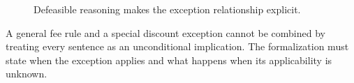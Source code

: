 \begin{figure}[H]
\centering
{}
\caption{Defeasible reasoning makes the exception relationship explicit.}\label{fig:teach-M04-01}
\end{figure}

A general fee rule and a special discount exception cannot be combined by treating every sentence as an unconditional implication. The formalization must state when the exception applies and what happens when its applicability is unknown.

